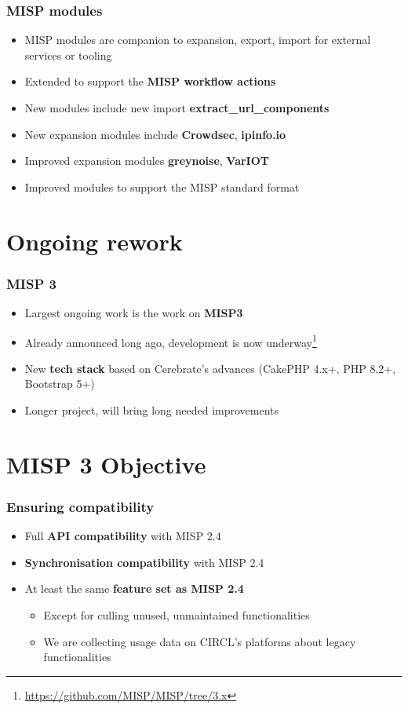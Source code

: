 \begin{frame}
\frametitle{MISP modules}
    \begin{itemize}
        \item MISP modules are companion to expansion, export, import for external services or tooling
        \item Extended to support the {\bf MISP workflow actions}
        \item New modules include new import {\bf extract\_url\_components}
        \item New expansion modules include {\bf Crowdsec}, {\bf ipinfo.io}
        \item Improved expansion modules  {\bf greynoise}, {\bf VarIOT}
        \item Improved modules to support the MISP standard format
    \end{itemize}
\end{frame}

\section{Ongoing rework}

\begin{frame}
  \frametitle{MISP 3}
  \begin{itemize}
     \item Largest ongoing work is the work on {\bf MISP3}
     \item Already announced long ago, development is now underway\footnote{\url{https://github.com/MISP/MISP/tree/3.x}}
     \item New {\bf tech stack} based on Cerebrate's advances (CakePHP 4.x+, PHP 8.2+, Bootstrap 5+)
     \item Longer project, will bring long needed improvements
  \end{itemize}
\end{frame}

\section{MISP 3 Objective}

\begin{frame}
  \frametitle{Ensuring compatibility}
  \begin{itemize}
     \item Full {\bf API compatibility} with MISP 2.4
     \item {\bf Synchronisation compatibility} with MISP 2.4
     \item At least the same {\bf feature set as MISP 2.4}
     \begin{itemize}
         \item Except for culling unused, unmaintained functionalities
         \item We are collecting usage data on CIRCL's platforms about legacy functionalities
     \end{itemize}
  \end{itemize}
\end{frame}

